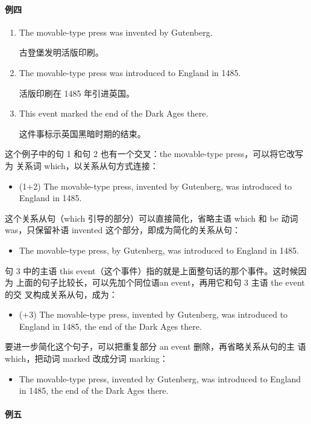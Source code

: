 \paragraph{例四}

\begin{enumerate}
\item The movable-type press was invented by Gutenberg.

  古登堡发明活版印刷。
\item The movable-type press was introduced to England in 1485.

  活版印刷在 1485 年引进英国。
\item This event marked the end of the Dark Ages there.

  这件事标示英国黑暗时期的结束。
\end{enumerate}

这个例子中的句 1 和句 2 也有一个交叉：the movable-type press，可以将它改写为
关系词 which，以关系从句方式连接：
\begin{itemize}
\item (1+2) The movable-type press,  invented by Gutenberg, was
  introduced to England in 1485.
\end{itemize}
这个关系从句（which 引导的部分）可以直接简化，省略主语 which 和 be 动词
was，只保留补语 invented 这个部分，即成为简化的关系从句：
\begin{itemize}
\item The movable-type press,  by Gutenberg, was introduced to England
  in 1485.
\end{itemize}
句 3 中的主语 this event（这个事件）指的就是上面整句话的那个事件。这时候因为
上面的句子比较长，可以先加个同位语an event，再用它和句 3 主语 the event 的交
叉构成关系从句，成为：
\begin{itemize}
\item (+3) The movable-type press, invented by Gutenberg, was introduced to
  England in 1485,  the end of the Dark Ages there.
\end{itemize}
要进一步简化这个句子，可以把重复部分 an event 删除，再省略关系从句的主
语which，把动词 marked 改成分词 marking：
\begin{itemize}
\item   The movable-type press, invented by Gutenberg, was introduced to
  England in 1485,  the end of the Dark Ages there.
\end{itemize}

\paragraph{例五}

